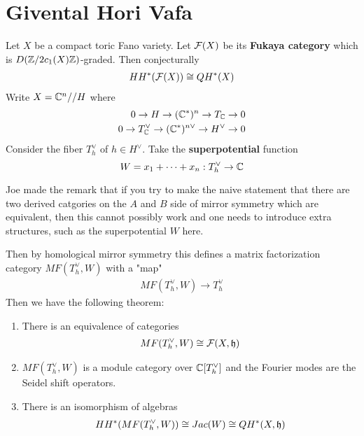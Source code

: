 \documentclass[12pt]{article}
\begin{document}
\section{Givental Hori Vafa}
Let $X$ be a compact toric Fano variety. Let ${\mathcal{F}}(X)$ be its \textbf{Fukaya category} which is $D(\mathbb{Z}/2c_1(X)\mathbb{Z})$-graded. Then conjecturally \begin{align*}
    HH^*({\mathcal{F}}(X))\cong QH^*(X)
\end{align*}
Write $X = \mathbb{C}^n // H$ where \begin{align*}
    0 \to H \to (\mathbb{C}^*)^n \to T_{\mathbb{C}} \to 0 \\
    0 \to T_{\mathbb{C}}^\vee \to (\mathbb{C}^*)^{n\vee} \to H^\vee \to 0
\end{align*}
Consider the fiber $T_h^\vee$ of $h\in H^\vee$.
Take the \textbf{superpotential} function \[W = x_1 + \cdots + x_n: T_h^\vee \to \mathbb{C}\]

\begin{remark}
    Joe made the remark that if you try to make the naive statement that there are two derived catgories on the $A$ and $B$ side of mirror symmetry which are equivalent, then this cannot possibly work and one needs to introduce extra structures, such as the superpotential $W$ here.
\end{remark}

Then by homological mirror symmetry this defines a matrix factorization category $MF(T_h^\vee, W)$ with a "map" \begin{align*}
    MF(T_h^\vee, W) \to T_h^\vee
\end{align*}
Then we have the following theorem:
\begin{theorem}
    \leavevmode
    \begin{enumerate}
        \item There is an equivalence of categories \begin{align*}
            MF(T_h^\vee, W) \cong {\mathcal{F}}(X, \mathfrak{h})
        \end{align*}
        \item $MF(T_h^\vee, W)$ is a module category over $\mathbb{C}[T^\vee_h]$ and the Fourier modes are the Seidel shift operators.
        \item There is an isomorphism of algebras \begin{align*}
            HH^*(MF(T_h^\vee, W)) \cong Jac(W) \cong QH^*(X, \mathfrak{h})
        \end{align*}
    \end{enumerate}
\end{theorem}
\end{document}
